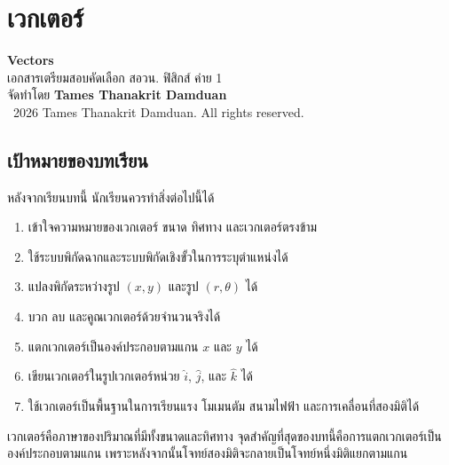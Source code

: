 
\chapter{เวกเตอร์}

\begin{center}
    {\Large \textbf{Vectors}}\\[4pt]
    {\normalsize เอกสารเตรียมสอบคัดเลือก สอวน. ฟิสิกส์ ค่าย 1}\\[6pt]
    {\normalsize จัดทำโดย \textbf{Tames Thanakrit Damduan}}\\[2pt]
    {\footnotesize \textcopyright\ 2026 Tames Thanakrit Damduan. All rights reserved.}\\[8pt]
\end{center}

\section*{เป้าหมายของบทเรียน}

หลังจากเรียนบทนี้ นักเรียนควรทำสิ่งต่อไปนี้ได้

\begin{enumerate}
    \item เข้าใจความหมายของเวกเตอร์ ขนาด ทิศทาง และเวกเตอร์ตรงข้าม
    \item ใช้ระบบพิกัดฉากและระบบพิกัดเชิงขั้วในการระบุตำแหน่งได้
    \item แปลงพิกัดระหว่างรูป $(x,y)$ และรูป $(r,\theta)$ ได้
    \item บวก ลบ และคูณเวกเตอร์ด้วยจำนวนจริงได้
    \item แตกเวกเตอร์เป็นองค์ประกอบตามแกน $x$ และ $y$ ได้
    \item เขียนเวกเตอร์ในรูปเวกเตอร์หน่วย $\hat{i}$, $\hat{j}$, และ $\hat{k}$ ได้
    \item ใช้เวกเตอร์เป็นพื้นฐานในการเรียนแรง โมเมนตัม สนามไฟฟ้า และการเคลื่อนที่สองมิติได้
\end{enumerate}

\begin{tcolorbox}[title=แนวคิดสำคัญของบทนี้]
เวกเตอร์คือภาษาของปริมาณที่มีทั้งขนาดและทิศทาง จุดสำคัญที่สุดของบทนี้คือการแตกเวกเตอร์เป็นองค์ประกอบตามแกน เพราะหลังจากนั้นโจทย์สองมิติจะกลายเป็นโจทย์หนึ่งมิติแยกตามแกน
\end{tcolorbox}

